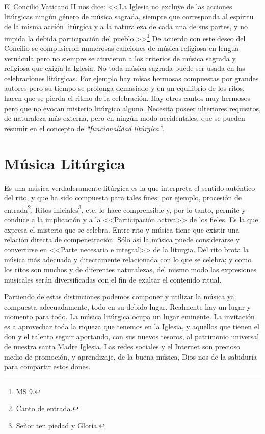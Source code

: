 \documentclass[letterpaper, 12pt]{book}
\begin{document}
    El Concilio Vaticano II nos dice: <<La Iglesia no excluye de las acciones lit\'urgicas ning\'un g\'enero de m\'usica sagrada, siempre que corresponda al esp\'iritu de la misma acci\'on lit\'urgica y a la naturaleza de cada una de sus partes, y no impida la debida participaci\'on del pueblo.>>\footnote{MS 9.} De acuerdo con este deseo del Concilio se \underline{compusieron} numerosas canciones de música religiosa en lengua vern\'acula pero no siempre se atuvieron a los criterios de m\'usica sagrada y religiosa que exig\'ia la Iglesia. No toda m\'usica sagrada puede ser usada en las celebraciones lit\'urgicas. Por ejemplo hay misas hermosas compuestas por grandes autores pero su tiempo se prolonga demasiado y en un equilibrio de los ritos, hacen que se pierda el ritmo de la celebración. Hay otros cantos muy hermosos pero que no evocan misterio lit\'urgico alguno. Necesita poseer ulteriores requisitos, de naturaleza m\'as externa, pero en ning\'un modo accidentales, que se pueden resumir en el concepto de \textit{``funcionalidad litúrgica''}.
        
    \section{M\'usica Lit\'urgica}
    Es una m\'usica verdaderamente lit\'urgica es la que interpreta el sentido aut\'entico del rito, y que ha sido compuesta para tales fines; por ejemplo, procesi\'on de entrada\footnote{Canto de entrada.}, Ritos iniciales\footnote{Se\~nor ten piedad y Gloria.}, etc. lo hace comprensible y, por lo tanto, permite y conduce a la implicaci\'on y a la <<Participaci\'on activa>> de los fieles. Es la que expresa el misterio que se celebra. Entre rito y m\'usica tiene que existir una relaci\'on directa de compenetraci\'on. S\'olo as\'i la m\'usica puede considerarse y convertirse en <<Parte necesaria e integral>> de la liturgia. Del rito brota la m\'usica m\'as adecuada y directamente relacionada con lo que se celebra; y como los ritos son muchos y de diferentes naturalezas, del mismo modo las expresiones musicales ser\'an diversificadas con el fin de exaltar el contenido ritual.\newline
    
    Partiendo de estas distinciones podemos componer y utilizar la m\'usica ya compuesta adecuadamente, todo en su debido lugar. Realmente hay un lugar y momento para todo. La m\'usica lit\'urgica ocupa un lugar eminente. La invitación es a aprovechar toda la riqueza que tenemos en la Iglesia, y aquellos que tienen el don y el talento seguir aportando, con sus nuevos tesoros, al patrimonio universal de nuestra santa Madre Iglesia. Las redes sociales y el Internet son precioso medio de promoci\'on, y aprendizaje, de la buena m\'usica, Dios nos de la sabidur\'ia para compartir estos dones.
    
\end{document}
